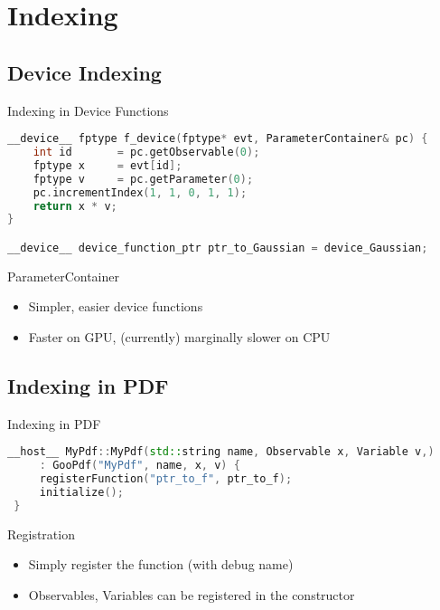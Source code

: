 \documentclass[aspectratio=169, smaller]{beamer}
\begin{document}
\section{Indexing}

\subsection{Device Indexing}
\begin{frame}[fragile]{Indexing in Device Functions}
\begin{lstlisting}[language=C++]
__device__ fptype f_device(fptype* evt, ParameterContainer& pc) {
    int id       = pc.getObservable(0);
    fptype x     = evt[id];
    fptype v     = pc.getParameter(0);
    pc.incrementIndex(1, 1, 0, 1, 1);
    return x * v;
}

__device__ device_function_ptr ptr_to_Gaussian = device_Gaussian;
\end{lstlisting}

\begin{block}{ParameterContainer}
    \begin{itemize}
        \item Simpler, easier device functions
        \item Faster on GPU, (currently) marginally slower on CPU
    \end{itemize}
\end{block}
\end{frame}

\subsection{Indexing in PDF}
\begin{frame}[fragile]{Indexing in PDF}
\begin{lstlisting}[language=C++]
 __host__ MyPdf::MyPdf(std::string name, Observable x, Variable v,)
     : GooPdf("MyPdf", name, x, v) {
     registerFunction("ptr_to_f", ptr_to_f);
     initialize();
 }
\end{lstlisting}

\begin{block}{Registration}
    \begin{itemize}
        \item Simply register the function (with debug name)
        \item Observables, Variables can be registered in the constructor
    \end{itemize}
\end{block}
\end{frame}
\end{document}
